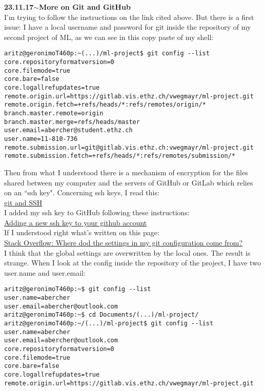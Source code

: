 \documentclass[11pt,a4paper]{article}
\newenvironment{loggentry}[2]%
{\noindent\textbf{#1}\hspace{1cm}$\mathbf{\sim}$\text{ }\textbf{#2}\\}{\vspace{0.5cm}}
\begin{document}
\begin{loggentry}{23.11.17}{More on Git and GitHub}
I'm trying to follow the instructions on the link cited above. But there is a first issue: I have a local username and password for git inside the repository of my second project of ML, as we can see in this copy paste of my shell:
\begin{verbatim}
aritz@geronimoT460p:~(...)/ml-project$ git config --list
core.repositoryformatversion=0
core.filemode=true
core.bare=false
core.logallrefupdates=true
remote.origin.url=https://gitlab.vis.ethz.ch/vwegmayr/ml-project.git
remote.origin.fetch=+refs/heads/*:refs/remotes/origin/*
branch.master.remote=origin
branch.master.merge=refs/heads/master
user.email=abercher@student.ethz.ch
user.name=11-810-736
remote.submission.url=git@gitlab.vis.ethz.ch:vwegmayr/ml-project.git
remote.submission.fetch=+refs/heads/*:refs/remotes/submission/*
\end{verbatim}
Then from what I understood there is a mechanism of encryption for the files shared between my computer and the servers of GitHub or GitLab which relies on an ``ssh key". Concerning ssh keys, I read this:\\
\href{https://git-scm.com/book/en/v2/Git-on-the-Server-Generating-Your-SSH-Public-Key}{git and SSH}\\
I added my ssh key to GitHub following these instructions:\\
\href{https://help.github.com/articles/adding-a-new-ssh-key-to-your-github-account/}{Adding a new ssh key to your github account}\\
If I understood right what's written on this page:\\
\href{https://stackoverflow.com/questions/17756753/where-do-the-settings-in-my-git-configuration-come-from}{Stack Overflow: Where dod the settings in my git configuration come from?}\\
I think that the global settings are overwritten by the local ones. The result is strange. When I look at the config inside the repository of the project, I have two user.name and user.email:
\begin{verbatim}
aritz@geronimoT460p:~$ git config --list
user.name=abercher
user.email=abercher@outlook.com
aritz@geronimoT460p:~$ cd Documents/(...)/ml-project/
aritz@geronimoT460p:~/(...)/ml-project$ git config --list
user.name=abercher
user.email=abercher@outlook.com
core.repositoryformatversion=0
core.filemode=true
core.bare=false
core.logallrefupdates=true
remote.origin.url=https://gitlab.vis.ethz.ch/vwegmayr/ml-project.git

\end{verbatim}
\end{loggentry}
\end{document}
